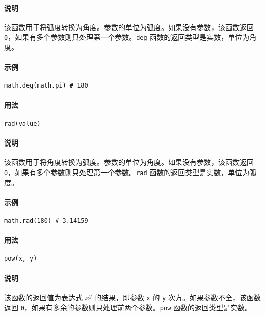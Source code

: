 \paragraph{说明}
该函数用于将弧度转换为角度。参数的单位为弧度。如果没有参数，该函数返回 \texttt{0}，如果有多个参数则只处理第一个参数。\texttt{deg} 函数的返回类型是实数，单位为角度。

\paragraph{示例}
\begin{lstlisting}[language=berry, numbers=none]
math.deg(math.pi) # 180
\end{lstlisting}


\paragraph{用法}
\begin{lstlisting}[language=berry, numbers=none]
rad(value)
\end{lstlisting}

\paragraph{说明}
该函数用于将角度转换为弧度。参数的单位为角度。如果没有参数，该函数返回 \texttt{0}，如果有多个参数则只处理第一个参数。\texttt{rad} 函数的返回类型是实数，单位为弧度。

\paragraph{示例}
\begin{lstlisting}[language=berry, numbers=none]
math.rad(180) # 3.14159
\end{lstlisting}


\paragraph{用法}
\begin{lstlisting}[language=berry, numbers=none]
pow(x, y)
\end{lstlisting}

\paragraph{说明}
该函数的返回值为表达式 $x^y$ 的结果，即参数 \texttt{x} 的 \texttt{y} 次方。如果参数不全，该函数返回 \texttt{0}，如果有多余的参数则只处理前两个参数。\texttt{pow} 函数的返回类型是实数。

